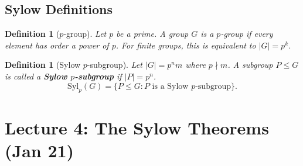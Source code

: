 \documentclass[a4paper,12pt]{article}
\newtheorem{defn}[thm]{Definition}
\begin{document}
\subsection{Sylow Definitions}

\begin{defn}[$p$-group]
    Let $p$ be a prime. A group $G$ is a $p$-group if every element has order a power of $p$. For finite groups, this is equivalent to $|G| = p^k$.
\end{defn}

\begin{defn}[Sylow $p$-subgroup]
    Let $|G| = p^n m$ where $p \nmid m$. A subgroup $P \leq G$ is called a \textbf{Sylow $p$-subgroup} if $|P| = p^n$.
    \[ \text{Syl}_p(G) = \{P \leq G : P \text{ is a Sylow } p\text{-subgroup}\}. \]
\end{defn}

\newpage
\section{Lecture 4: The Sylow Theorems (Jan 21)}
\end{document}
